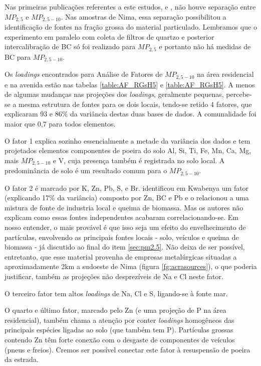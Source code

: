 Nas primeiras publicações referentes a este estudos, \citet{ARKU2008} e 
\citet{DIONISIO2010}, não houve separação entre $MP_{2,5}$ e $MP_{2,5-10}$. 
Nas amostras de Nima, essa separação possibilitou a identificação
de fontes na fração grossa do material particulado. Lembramos que o experimento
em paralelo com coleta de filtros de quartzo e posterior intercalibração de BC
só foi realizado para $MP_{2,5}$ e portanto não há medidas de BC para 
$MP_{2,5-10}$.

Os \textit{loadings} encontrados para Análise de Fatores de $MP_{2,5-10}$
na área residencial e na avenida estão nas tabelas \ref{table:AF_RGsH5} e 
\ref{table:AF_RGsH5}. A menos de algumas mudanças nas projeções dos 
\textit{loadings}, geralmente pequenas, percebe-se a mesma estrutura de fontes 
para os dois locais, tendo-se retido 4 fatores, que explicaram 93 e 86\% da 
variância destas duas bases de dados. A comunalidade foi maior que 0,7 para 
todos elementos.

O fator 1 explica sozinho essencialmente a metade da variância dos dados e tem 
projetados elementos componentes de poeira do solo Al, Si, Ti, Fe, Mn, Ca, 
Mg, mais $MP_{2,5-10}$ e V, cuja presença também é registrada no solo local. 
A predominância de solo é um resultado comum para o $MP_{2,5-10}$.

O fator 2 é marcado por K, Zn, Pb, S, e Br. 
\citet{aboh2009} identificou em Kwabenya um fator (explicando 17\% da 
variância) composto por Zn, BC e Pb e o relacionou a uma mistura de 
fonte de industria local e queima de biomassa. Mas os autores não explicam como 
essas fontes independentes acabaram correlacionando-se. Em nosso entender, o 
mais provável é que isso seja um efeito do envelhecimento de partículas, 
envolvendo as principais fontes locais - solo, veículos e queima de biomassa - 
já discutido ao final do item  \ref{sec:pm2.5}. Não deixa de ser possível, 
entretanto, que esse material provenha de empresas metalúrgicas situadas a
aproximadamente 2km a sudoeste de Nima (figura \ref{fg:acrasources}), 
o que poderia justificar, também as projeções não desprezíveis de Na e Cl 
neste fator.

O terceiro fator tem altos \textit{loadings} de Na, Cl e S, 
ligando-se à fonte mar. 

O quarto e último fator, marcado pelo Zn (e uma projeção de P na área 
residencial), também chama a atenção por conter \textit{loadings} homogêneos 
das principais espécies ligadas ao solo (que também tem P). Partículas grossas 
contendo Zn têm forte conexão com o desgaste de componentes de veículos 
(pneus e freios). Cremos ser possível conectar este fator à resuspensão de 
poeira da estrada. 

